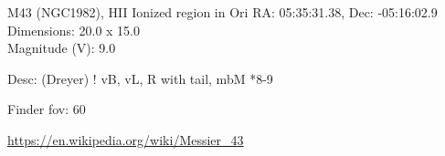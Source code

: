 \begin{block}{M43 (NGC1982), HII Ionized region in Ori}
    RA: 05:35:31.38, Dec: -05:16:02.9 \\ 
    Dimensions: 20.0 x 15.0 \\ 
    Magnitude (V): 9.0


    Desc: (Dreyer) ! vB, vL, R with tail, mbM *8-9 

    Finder fov: 60 

    \url{https://en.wikipedia.org/wiki/Messier_43} 
\end{block}